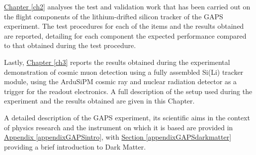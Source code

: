 \par
\hyperref[ch2]{Chapter \ref{ch2}} analyses the test and validation work that has been carried out on the flight components of the lithium-drifted silicon tracker of the GAPS experiment. The test procedures for each of the items and the results obtained are reported, detailing for each component the expected performance compared to that obtained during the test procedure.

\par
Lastly, \hyperref[ch3]{Chapter \ref{ch3}} reports the results obtained during the experimental demonstration of cosmic muon detection using a fully assembled Si(Li) tracker module, using the ArduSiPM cosmic ray and nuclear radiation detector as a trigger for the readout electronics. A full description of the setup used during the experiment and the results obtained are given in this Chapter.

\par
A detailed description of the GAPS experiment, its scientific aims in the context of physics research and the instrument on which it is based are provided in \hyperref[appendixGAPSintro]{Appendix \ref{appendixGAPSintro}}, with \hyperref[appendixGAPSdarkmatter]{Section \ref{appendixGAPSdarkmatter}} providing a brief introduction to Dark Matter.